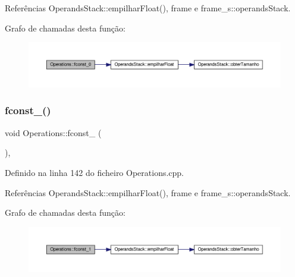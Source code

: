 Referências Operands\+Stack\+::empilhar\+Float(), frame e frame\+\_\+s\+::operands\+Stack.

Grafo de chamadas desta função\+:\nopagebreak
\begin{figure}[H]
\begin{center}
\leavevmode
\includegraphics[width=350pt]{classOperations_ad3d2d82d63e7a96e144cdf014d6fb1d9_cgraph}
\end{center}
\end{figure}
\mbox{\label{classOperations_aa2053d7f3d410a4531f5bd560b4211b4}} 
\subsubsection{\texorpdfstring{fconst\+\_()}{fconst\_1()}}
{\footnotesize\ttfamily void Operations\+::fconst\+\_ (\begin{DoxyParamCaption}{ }\end{DoxyParamCaption})\hspace{0.3cm}{\ttfamily [static]}, {\ttfamily [private]}}



Definido na linha 142 do ficheiro Operations.\+cpp.



Referências Operands\+Stack\+::empilhar\+Float(), frame e frame\+\_\+s\+::operands\+Stack.

Grafo de chamadas desta função\+:\nopagebreak
\begin{figure}[H]
\begin{center}
\leavevmode
\includegraphics[width=350pt]{classOperations_aa2053d7f3d410a4531f5bd560b4211b4_cgraph}
\end{center}
\end{figure}
\mbox{\label{classOperations_a1857c1a0e34d6f91dcb7166ca6d678a2}} 
